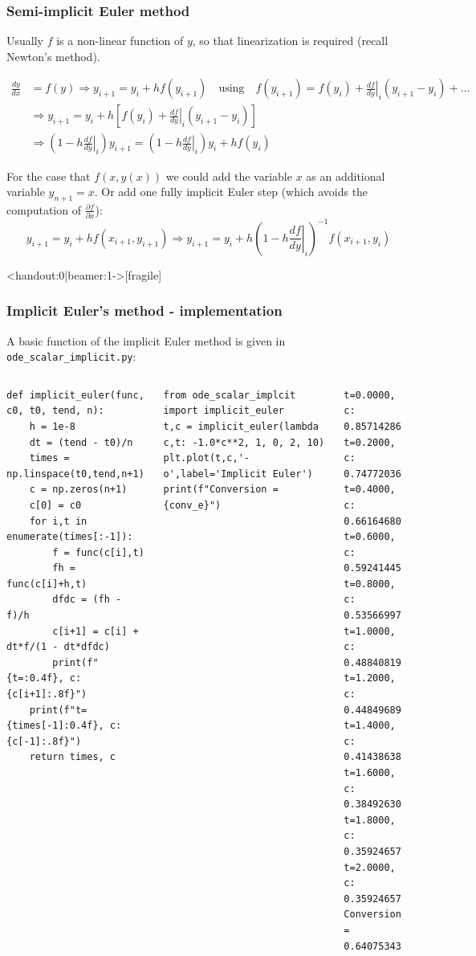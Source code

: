 \begin{frame}
  \frametitle{Semi-implicit Euler method}
  \footnotesize\selectfont
  Usually $f$ is a non-linear function of $y$, so that linearization is required (recall Newton's method).
  
  \begin{align*}
    \frac{dy}{dx} &= f(y) \Rightarrow y_{i+1} = y_i + h f (y_{i+1}) \quad \text{using} \quad f(y_{i+1}) = f(y_i) + \left.\frac{df}{dy}\right|_i(y_{i+1}-y_i) + \ldots \\
  &\Rightarrow y_{i+1} =  y_i + h \left[ f(y_i) + \left.\frac{df}{dy}\right|_i (y_{i+1}-y_i) \right] \\ 
  &\Rightarrow \left(1-h\left.\frac{df}{dy}\right|_i \right)y_{i+1} = \left(1-h\left.\frac{df}{dy}\right|_i\right)y_i + h f(y_i) 
  \end{align*}
  
  \pause
  For the case that $f(x,y(x))$ we could add the variable $x$ as an additional variable $y_{n+1}=x$. Or add one fully implicit Euler step (which avoids the computation of $\frac{\partial f}{\partial x}$): \vspace*{-1em}
  \[
    y_{i+1} = y_i + h f(x_{i+1},y_{i+1}) \Rightarrow y_{i+1} = y_i + h \left(1-h\left.\frac{df}{dy}\right|_i \right)^{-1} f(x_{i+1},y_i)
  \]
\end{frame}


\begin{frame}<handout:0|beamer:1->[fragile]
  \frametitle{Implicit Euler's method - implementation}
  A basic function of the implicit Euler method is given in \lstinline$ode_scalar_implicit.py$:
  \begin{columns}
      \begin{lstlisting}
def implicit_euler(func, c0, t0, tend, n):
    h = 1e-8
    dt = (tend - t0)/n
    times = np.linspace(t0,tend,n+1)
    c = np.zeros(n+1)
    c[0] = c0
    for i,t in enumerate(times[:-1]):
        f = func(c[i],t)
        fh = func(c[i]+h,t)
        dfdc = (fh - f)/h
        c[i+1] = c[i] + dt*f/(1 - dt*dfdc)
        print(f"{t=:0.4f}, c: {c[i+1]:.8f}")
    print(f"t={times[-1]:0.4f}, c: {c[-1]:.8f}")
    return times, c
  \end{lstlisting}
  \pause
      \begin{lstlisting}
from ode_scalar_implcit import implicit_euler
t,c = implicit_euler(lambda c,t: -1.0*c**2, 1, 0, 2, 10)
plt.plot(t,c,'-o',label='Implicit Euler')
print(f"Conversion = {conv_e}")
      \end{lstlisting}
    \pause
      \begin{lstlisting}[style=PyOutput]
t=0.0000, c: 0.85714286
t=0.2000, c: 0.74772036
t=0.4000, c: 0.66164680
t=0.6000, c: 0.59241445
t=0.8000, c: 0.53566997
t=1.0000, c: 0.48840819
t=1.2000, c: 0.44849689
t=1.4000, c: 0.41438638
t=1.6000, c: 0.38492630
t=1.8000, c: 0.35924657
t=2.0000, c: 0.35924657
Conversion = 0.64075343
      \end{lstlisting}
  \end{columns}
\end{frame}

